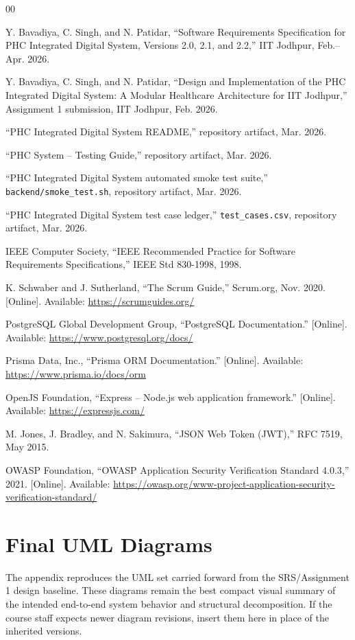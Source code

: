 \documentclass[conference]{IEEEtran}
\begin{document}
\begin{thebibliography}{00}

 Y. Bavadiya, C. Singh, and N. Patidar, ``Software Requirements Specification for PHC Integrated Digital System, Versions 2.0, 2.1, and 2.2,'' IIT Jodhpur, Feb.--Apr. 2026.

 Y. Bavadiya, C. Singh, and N. Patidar, ``Design and Implementation of the PHC Integrated Digital System: A Modular Healthcare Architecture for IIT Jodhpur,'' Assignment 1 submission, IIT Jodhpur, Feb. 2026.

 ``PHC Integrated Digital System README,'' repository artifact, Mar. 2026.

 ``PHC System -- Testing Guide,'' repository artifact, Mar. 2026.

 ``PHC Integrated Digital System automated smoke test suite,'' \texttt{backend/smoke\_test.sh}, repository artifact, Mar. 2026.

 ``PHC Integrated Digital System test case ledger,'' \texttt{test\_cases.csv}, repository artifact, Mar. 2026.

 IEEE Computer Society, ``IEEE Recommended Practice for Software Requirements Specifications,'' IEEE Std 830-1998, 1998.

 K. Schwaber and J. Sutherland, ``The Scrum Guide,'' Scrum.org, Nov. 2020. [Online]. Available: \url{https://scrumguides.org/}

 PostgreSQL Global Development Group, ``PostgreSQL Documentation.'' [Online]. Available: \url{https://www.postgresql.org/docs/}

 Prisma Data, Inc., ``Prisma ORM Documentation.'' [Online]. Available: \url{https://www.prisma.io/docs/orm}

 OpenJS Foundation, ``Express -- Node.js web application framework.'' [Online]. Available: \url{https://expressjs.com/}

 M. Jones, J. Bradley, and N. Sakimura, ``JSON Web Token (JWT),'' RFC 7519, May 2015.

 OWASP Foundation, ``OWASP Application Security Verification Standard 4.0.3,'' 2021. [Online]. Available: \url{https://owasp.org/www-project-application-security-verification-standard/}

\end{thebibliography}

\clearpage
\appendices
\section{Final UML Diagrams}
The appendix reproduces the UML set carried forward from the SRS/Assignment 1 design baseline. These diagrams remain the best compact visual summary of the intended end-to-end system behavior and structural decomposition. If the course staff expects newer diagram revisions, insert them here in place of the inherited versions.
\end{document}
